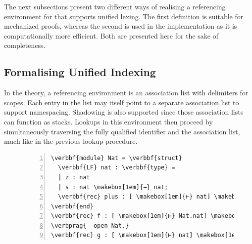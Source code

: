 The next subsections present two different ways of realising a referencing environment for \Beluga that supports unified lexing.
The first definition is suitable for mechanized proofs, whereas the second is used in the implementation as it is computationally more efficient.
Both are presented here for the sake of completeness.

\subsection{Formalising Unified Indexing}

In the theory, a referencing environment is an association list with delimiters for scopes.
Each entry in the list may itself point to a separate association list to support namespacing.
Shadowing is also supported since those association lists can function as stacks.
Lookups in this environment then proceed by simultaneously traversing the fully qualified identifier and the association list, much like in the previous lookup procedure.


\begin{figure}[htb]
\begin{Verbatim}[commandchars=\\\{\}, baselinestretch=1, numbers=left]
\verbbf{module} Nat = \verbbf{struct}
  \verbbf{LF} nat : \verbbf{type} =
  | z : nat
  | s : nat \makebox[1em]{→} nat;
  \verbbf{rec} plus : [ \makebox[1em]{⊢} nat] \makebox[1em]{→} [ \makebox[1em]{⊢} nat] \makebox[1em]{→} [ \makebox[1em]{⊢} nat] = \verbhole{?h1};
\verbbf{end}
\verbbf{rec} f : [ \makebox[1em]{⊢} Nat.nat] \makebox[1em]{→} [ \makebox[1em]{⊢} Nat.nat] = \verbhole{?h2};
\verbprag{--open Nat.}
\verbbf{rec} g : [ \makebox[1em]{⊢} nat] \makebox[1em]{→} [ \makebox[1em]{⊢} nat] = \verbhole{?h3};
\end{Verbatim}
\caption[]{%
}
\label{figure:referencing-environment-example}
\end{figure}




\newcommand{\private}[1]{#1_\downarrow}
\newcommand{\public}[1]{#1_\uparrow}
\newcommand{\Private}[1]{#1_\Downarrow}
\newcommand{\Public}[1]{#1_\Uparrow}
\newcommand{\Env}{\Xi}
\newcommand{\Scope}{\mathbb{S}}
\newcommand{\Module}{\mathbb{M}}
\newcommand{\Pattern}{\mathbb{P}}
\newcommand{\Entry}{\mathbb{E}}
\newcommand{\Var}{\mathbb{V}}
\newcommand{\Constant}{\mathbb{C}}

